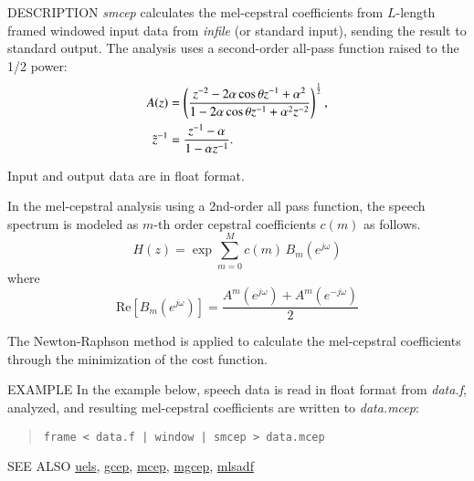 \begin{synopsis}
\item [smcep] [ --a $A$ ] [ --t $T$ ] [ --m $M$ ] [ --l $L$ ]
\item [\ ~~~~] [ --i $I$ ] [ --j $J$ ] [ --d $D$ ] [ --e $E$ ] [ {\em infile} ]
\end{synopsis}

\begin{qsection}{DESCRIPTION}
{\em smcep} calculates the mel-cepstral coefficients 
from $L$-length framed windowed input data 
from {\em infile} (or standard input), 
sending the result to standard output. 
The analysis uses a second-order all-pass function raised to the 1/2 power: 
\begin{align}
A(z) &=
\left(
\frac{z^{-2}-2\alpha \cos \theta z^{-1}+\alpha^2}
	{1-2\alpha \cos \theta z^{-1}+\alpha^2 z^{-2}}
\right)^{\frac{1}{2}}, \notag \\
\tilde{z}^{-1} &= \frac{z^{-1}-\alpha}{1-\alpha z^{-1}}. \notag
\end{align}

Input and output data are in float format.

In the mel-cepstral analysis using
a 2nd-order all pass function,
the speech spectrum is modeled as $m$-th order cepstral
coefficients $c(m)$ as follows.
\begin{displaymath}
H(z) = \exp \sum_{m=0}^{M} c(m)\,B_m(e^{j\omega})
\end{displaymath}
where
\begin{displaymath}
\mathrm{Re}\left[B_m(e^{j\omega})\right]
	= \frac{A^m(e^{j\omega})+A^m(e^{-j\omega})}{2}
\end{displaymath}
\par The Newton-Raphson method is applied to calculate
the mel-cepstral coefficients through the minimization
of the cost function.
\end{qsection}

\newpage
\begin{options}
\end{options}

\begin{qsection}{EXAMPLE}
In the example below, speech data is read in float format
from {\em data.f}, analyzed, and resulting mel-cepstral
coefficients are written to {\em data.mcep}:
\begin{quote}
 \verb!frame < data.f | window | smcep > data.mcep !
\end{quote}
\end{qsection}

\begin{qsection}{SEE ALSO}
\hyperlink{uels}{uels},
\hyperlink{gcep}{gcep},
\hyperlink{mcep}{mcep},
\hyperlink{mgcep}{mgcep},
\hyperlink{mlsadf}{mlsadf}
\end{qsection}

